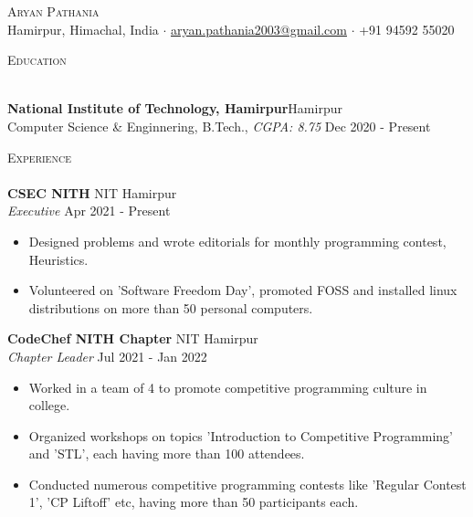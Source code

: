 \documentclass[a4paper]{article}
\newcommand{\lineunder} {
    \vspace*{-8pt} \\
    \hspace*{-18pt} \hrulefill \\
}
\newcommand{\header} [1] {
    {\hspace*{-18pt}\vspace*{6pt} \textsc{#1}}
    \vspace*{-6pt} \lineunder
}
\begin{document}

\begin{center}
	{\Huge \scshape {Aryan Pathania}}\\
	Hamirpur, Himachal, India $\cdot$ \href{mailto: aryan.pathania2003@gmail.com}{aryan.pathania2003@gmail.com} $\cdot$ +91 94592 55020\\
\end{center}



\header{Education}
\vspace{1mm}

\textbf{National Institute of Technology, Hamirpur}\hfill Hamirpur\\
Computer Science \& Enginnering, B.Tech., \textit{CGPA: 8.75} \hfill Dec 2020 - Present\\
\vspace{2mm}



\header{Experience}
\vspace{1mm}
\textbf{CSEC NITH} \hfill NIT Hamirpur\\
\textit{Executive} \hfill Apr 2021 - Present\\
\begin{itemize}
	\item Designed problems and wrote editorials for monthly programming contest, Heuristics.
	\item Volunteered on 'Software Freedom Day', promoted FOSS and installed linux distributions on more than 50 personal computers.
\end{itemize}
\vspace{1.5mm}

\textbf{CodeChef NITH Chapter} \hfill NIT Hamirpur\\
\textit{Chapter Leader} \hfill Jul 2021 - Jan 2022\\
\begin{itemize}
    \item Worked in a team of 4 to promote competitive programming culture in college.
	\item Organized workshops on topics 'Introduction to Competitive Programming' and 'STL', each having more than 100 attendees.
	\item Conducted numerous competitive programming contests like 'Regular Contest 1', 'CP Liftoff' etc, having more than 50 participants each.
\end{itemize}
\vspace{1.5mm}
\end{document}

